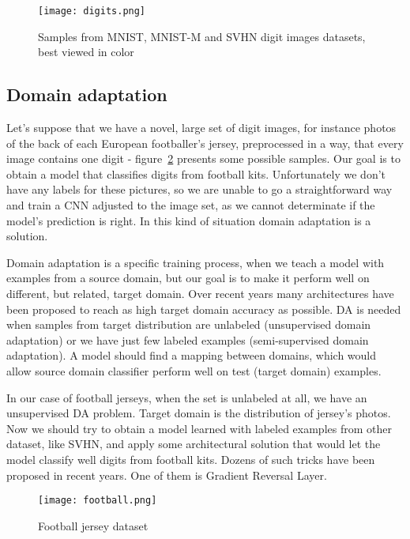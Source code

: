 \documentclass{article}
\begin{document}
\begin{figure}%
    \centering
    \texttt{[image: digits.png]}%
    \caption{Samples from MNIST, MNIST-M and SVHN digit images datasets, best viewed in color}
    \label{fig:digits}%
\end{figure}

\subsection{Domain adaptation}
Let's suppose that we have a novel, large set of digit images, for instance photos of the back of each European footballer's jersey, preprocessed in a way, that every image contains one digit - figure~\ref{fig:football} presents some possible samples. Our goal is to obtain a model that classifies digits from football kits. Unfortunately we don't have any labels for these pictures, so we are unable to go a straightforward way and train a CNN adjusted to the image set, as we cannot determinate if the model's prediction is right. In this kind of situation domain adaptation is a solution.
\par
Domain adaptation is a specific training process, when we teach a model with examples from a source domain, but our goal is to make it perform well on different, but related, target domain. Over recent years many architectures have been proposed to reach as high target domain accuracy as possible. DA is needed when samples from target distribution are unlabeled (unsupervised domain adaptation) or we have just few labeled examples (semi-supervised domain adaptation). A model should find a mapping between domains, which would allow source domain classifier perform well on test (target domain) examples.
\par
In our case of football jerseys, when the set is unlabeled at all, we have an unsupervised DA problem. Target domain is the distribution of jersey's photos. Now we should try to obtain a model learned with labeled examples from other dataset, like SVHN, and apply some architectural solution that would let the model classify well digits from football kits. Dozens of such tricks have been proposed in recent years. One of them is Gradient Reversal Layer.

\begin{figure}%
    \centering
    \texttt{[image: football.png]}%
    \caption{Football jersey dataset}
    \label{fig:football}%
\end{figure}
\end{document}
